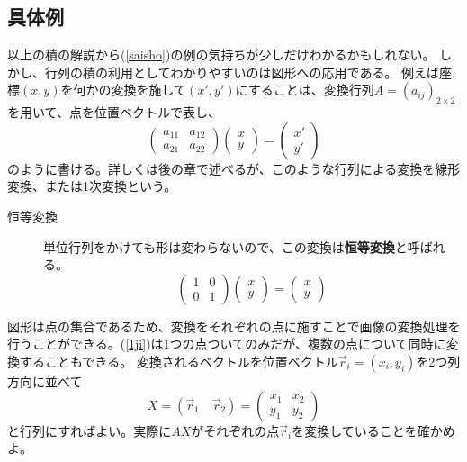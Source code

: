 \documentclass[10pt]{jsarticle}
\theoremstyle{definition}%
\newcommand{\kakko}[1]{\left(#1 \right)} %
\newcommand{\vc}[1]{\overrightarrow{#1}}%
\numberwithin{equation}{section}%
\begin{document}
\subsection{具体例}
以上の積の解説から(\ref{saisho})の例の気持ちが少しだけわかるかもしれない。
しかし、行列の積の利用としてわかりやすいのは図形への応用である。
例えば座標$(x,y)$を何かの変換を施して$(x',y')$にすることは、変換行列$A=(a_{ij})_{2\times 2}$を用いて、点を位置ベクトルで表し、
\begin{equation}
 \label{1ji} \kakko{\begin{matrix}
 a_{11} & a_{12}  \\
 a_{21} & a_{22}
  \end{matrix}}
  \kakko{\begin{matrix}
 x  \\
 y
  \end{matrix}}=
  \kakko{\begin{matrix}
 x'  \\
 y'
  \end{matrix}}
\end{equation}
のように書ける。詳しくは後の章で述べるが、このような行列による変換を線形変換、または1次変換という。
\begin{framed}
  \begin{description}
    \item[恒等変換] 
    単位行列をかけても形は変わらないので、この変換は{\bf 恒等変換}と呼ばれる。
    \begin{equation}
      \kakko{\begin{matrix}
      1 & 0  \\
      0 & 1
      \end{matrix}}
      \kakko{\begin{matrix}
     x  \\
     y
      \end{matrix}}=
      \kakko{\begin{matrix}
     x  \\
     y
      \end{matrix}}
    \end{equation}
  \end{description}
\end{framed}
図形は点の集合であるため、変換をそれぞれの点に施すことで画像の変換処理を行うことができる。(\ref{1ji})は1つの点ついてのみだが、複数の点について同時に変換することもできる。
変換されるベクトルを位置ベクトル$\vc{r}_{i}=(x_{i},y_{i})$を2つ列方向に並べて
\begin{equation}
  X=(\vc{r}_{1}\quad \vc{r}_{2})=
  \kakko{
    \begin{matrix}
      x_{1} & x_{2}\\
      y_{1} & y_{2}
    \end{matrix}
  }
\end{equation}
と行列にすればよい。実際に$AX$がそれぞれの点$\vc{r}_{i}$を変換していることを確かめよ。
\end{document}
